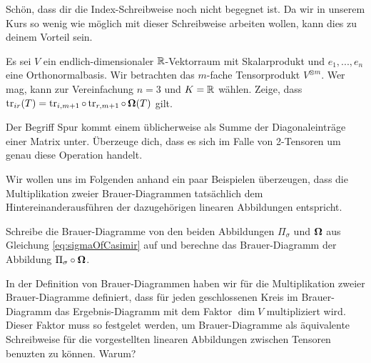 \begin{sheet}
\begin{problem}[title={Was denn für Indizes?}]
	Schön, dass dir die Index-Schreibweise noch nicht begegnet ist. Da wir in unserem Kurs so wenig wie möglich mit dieser Schreibweise arbeiten wollen, kann dies zu deinem Vorteil sein.

	Es sei $V$ ein endlich-dimensionaler $\mathbb{R}$-Vektorraum mit Skalarprodukt und $e_1, ..., e_n$ eine Orthonormalbasis. Wir betrachten das $m$-fache Tensorprodukt $V^{\otimes m}$. Wer mag, kann zur Vereinfachung $n=3$ und $K=\mathbb{R}$ wählen. Zeige, dass $\operatorname{tr}_{ir}(T)=\operatorname{tr}_{i,m+1}\circ\operatorname{tr}_{r,m+1}\circ\operatorname{\mathbf{\Omega}}(T)$ gilt.

\end{problem}


\begin{problem}[title={Warum heißt das Spur?}]
	Der Begriff Spur kommt einem üblicherweise als Summe der Diagonaleinträge einer Matrix unter. Überzeuge dich, dass es sich im Falle von 2-Tensoren um genau diese Operation handelt.
\end{problem}

\begin{problem}[title={Brauer-Diagramme}]
	Wir wollen uns im Folgenden anhand ein paar Beispielen überzeugen, dass die Multiplikation zweier Brauer-Diagrammen tatsächlich dem Hintereinanderausführen der dazugehörigen linearen Abbildungen entspricht.
	\begin{subproblem}
		Schreibe die Brauer-Diagramme von den beiden Abbildungen $\Pi_\sigma$ und $\operatorname{\mathbf{\Omega}}$ aus Gleichung \ref{eq:sigmaOfCasimir} auf und berechne das Brauer-Diagramm der  Abbildung $\Pi_\sigma \circ\operatorname{\mathbf{\Omega}}$.
	\end{subproblem}
	\begin{subproblem}
		In der Definition von Brauer-Diagrammen haben wir für die Multiplikation zweier Brauer-Diagramme definiert, dass für jeden geschlossenen Kreis im Brauer-Diagramm das Ergebnis-Diagramm mit dem Faktor $\dim{V}$ multipliziert wird. Dieser Faktor muss so festgelet werden, um Brauer-Diagramme als äquivalente Schreibweise für die vorgestellten linearen Abbildungen zwischen Tensoren benuzten zu können. Warum?
		

\end{subproblem}
\end{problem}
\end{sheet}
